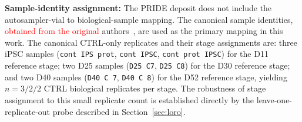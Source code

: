 \documentclass[5p,times,twocolumn]{elsarticle}
\newcommand{\rtag}[1]{}
\newcommand{\lang}[1]{\textcolor{red}{#1}}
\begin{document}
\begin{table}[!htbp]
  \color{red}
  \caption{\rtag{R2.5}Canonical CTRL proteomic replicates: sample
    label, stage assignment, number of replicates $n$ in the
    stage, per-marker abundance
    ($\log_{2}(1+\text{LFQ})$; n.q.\ = not quantified, LFQ $= 0$,
    entering Eq.~\eqref{eq:Pr} as 0),
    and the replicate-level proteomic score $Pr$
    (Eq.~\eqref{eq:Pr}).}
  \label{tab:replicates}
  \centering
\end{table}

\textbf{Sample-identity assignment:}
The PRIDE deposit does not include the autosampler-vial to
biological-sample mapping.
The canonical sample identities, \lang{obtained from the original} authors~\cite{novak2022single}, are used as the primary mapping in this work.
The canonical CTRL-only replicates and their stage
assignments are: three iPSC samples (\texttt{cont IPS prot},
\texttt{cont IPSC}, \texttt{cont prot IPSC}) for the D11
reference stage; two D25 samples (\texttt{D25 C7},
\texttt{D25 C8}) for the D30 reference stage; and two D40
samples (\texttt{D40 C 7}, \texttt{D40 C 8}) for the D52
reference stage, yielding $n = 3/2/2$ CTRL biological
replicates per stage.
The robustness of stage assignment to this small replicate
count is established directly by the leave-one-replicate-out
probe described in Section~\ref{sec:loro}.
\end{document}
